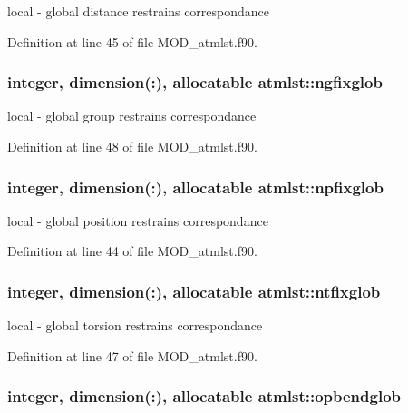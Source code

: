 local -\/ global distance restrains correspondance 



Definition at line 45 of file M\-O\-D\-\_\-atmlst.\-f90.

\hypertarget{classatmlst_a5f17c711f128e6273d752685aee21446}{
\subsubsection[{ngfixglob}]{\setlength{\rightskip}{0pt plus 5cm}integer, dimension(\-:), allocatable atmlst\-::ngfixglob}}\label{classatmlst_a5f17c711f128e6273d752685aee21446}


local -\/ global group restrains correspondance 



Definition at line 48 of file M\-O\-D\-\_\-atmlst.\-f90.

\hypertarget{classatmlst_a6efb0a7f8849ad799c89682d66e81b9c}{
\subsubsection[{npfixglob}]{\setlength{\rightskip}{0pt plus 5cm}integer, dimension(\-:), allocatable atmlst\-::npfixglob}}\label{classatmlst_a6efb0a7f8849ad799c89682d66e81b9c}


local -\/ global position restrains correspondance 



Definition at line 44 of file M\-O\-D\-\_\-atmlst.\-f90.

\hypertarget{classatmlst_a8f4e19f6b70e85447e97344a64e5e99c}{
\subsubsection[{ntfixglob}]{\setlength{\rightskip}{0pt plus 5cm}integer, dimension(\-:), allocatable atmlst\-::ntfixglob}}\label{classatmlst_a8f4e19f6b70e85447e97344a64e5e99c}


local -\/ global torsion restrains correspondance 



Definition at line 47 of file M\-O\-D\-\_\-atmlst.\-f90.

\hypertarget{classatmlst_aaf241c6055a6a6dbc04af10bb6a84920}{
\subsubsection[{opbendglob}]{\setlength{\rightskip}{0pt plus 5cm}integer, dimension(\-:), allocatable atmlst\-::opbendglob}}\label{classatmlst_aaf241c6055a6a6dbc04af10bb6a84920}


